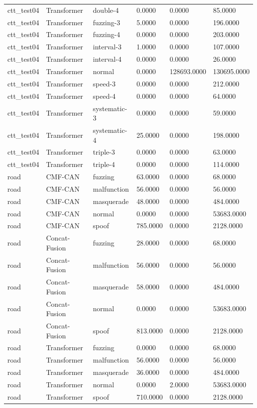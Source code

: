 \begin{tabular}{llllll}
ctt_test04 & Transformer & double-4 & 0.0000 & 0.0000 & 85.0000 \\
ctt_test04 & Transformer & fuzzing-3 & 5.0000 & 0.0000 & 196.0000 \\
ctt_test04 & Transformer & fuzzing-4 & 0.0000 & 0.0000 & 203.0000 \\
ctt_test04 & Transformer & interval-3 & 1.0000 & 0.0000 & 107.0000 \\
ctt_test04 & Transformer & interval-4 & 0.0000 & 0.0000 & 26.0000 \\
ctt_test04 & Transformer & normal & 0.0000 & 128693.0000 & 130695.0000 \\
ctt_test04 & Transformer & speed-3 & 0.0000 & 0.0000 & 212.0000 \\
ctt_test04 & Transformer & speed-4 & 0.0000 & 0.0000 & 64.0000 \\
ctt_test04 & Transformer & systematic-3 & 0.0000 & 0.0000 & 59.0000 \\
ctt_test04 & Transformer & systematic-4 & 25.0000 & 0.0000 & 198.0000 \\
ctt_test04 & Transformer & triple-3 & 0.0000 & 0.0000 & 63.0000 \\
ctt_test04 & Transformer & triple-4 & 0.0000 & 0.0000 & 114.0000 \\
road & CMF-CAN & fuzzing & 63.0000 & 0.0000 & 68.0000 \\
road & CMF-CAN & malfunction & 56.0000 & 0.0000 & 56.0000 \\
road & CMF-CAN & masquerade & 48.0000 & 0.0000 & 484.0000 \\
road & CMF-CAN & normal & 0.0000 & 0.0000 & 53683.0000 \\
road & CMF-CAN & spoof & 785.0000 & 0.0000 & 2128.0000 \\
road & Concat-Fusion & fuzzing & 28.0000 & 0.0000 & 68.0000 \\
road & Concat-Fusion & malfunction & 56.0000 & 0.0000 & 56.0000 \\
road & Concat-Fusion & masquerade & 58.0000 & 0.0000 & 484.0000 \\
road & Concat-Fusion & normal & 0.0000 & 0.0000 & 53683.0000 \\
road & Concat-Fusion & spoof & 813.0000 & 0.0000 & 2128.0000 \\
road & Transformer & fuzzing & 0.0000 & 0.0000 & 68.0000 \\
road & Transformer & malfunction & 56.0000 & 0.0000 & 56.0000 \\
road & Transformer & masquerade & 36.0000 & 0.0000 & 484.0000 \\
road & Transformer & normal & 0.0000 & 2.0000 & 53683.0000 \\
road & Transformer & spoof & 710.0000 & 0.0000 & 2128.0000 \\
\bottomrule
\end{tabular}
